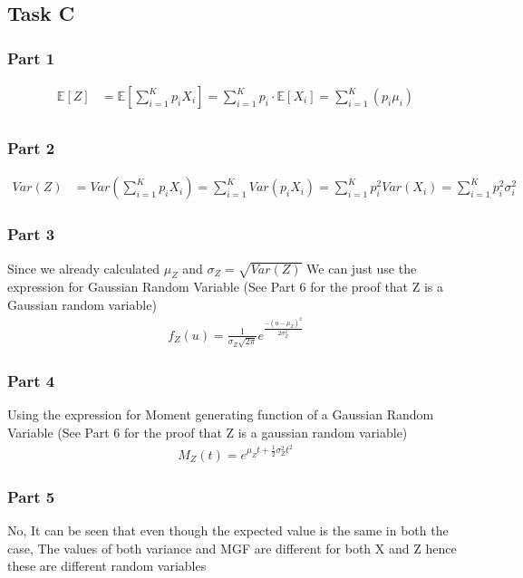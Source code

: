 \subsection{Task C}
\subsubsection{Part 1}
    \begin{align*}
        \mathbb{E}[Z]&=\mathbb{E}\left[ \sum_{i=1}^K p_iX_i\right]=\sum_{i=1}^K p_i \cdot \mathbb{E}\left[ X_i\right]=\sum_{i=1}^{K} \left(p_i\mu_i\right)\\
    \end{align*}

\subsubsection{Part 2}
    \begin{align*}
        Var(Z)&=Var\left(\sum_{i=1}^K p_iX_i\right)=\sum_{i=1}^K Var\left(p_iX_i\right)=\sum_{i=1}^K p_i^2Var\left(X_i\right)=\sum_{i=1}^K p_i^2\sigma_i^2
    \end{align*}
\subsubsection{Part 3}
    Since we already calculated $\mu_Z$ and $\sigma_Z = \sqrt{Var(Z)}$ We can just use the expression for Gaussian Random Variable (See Part 6 for the proof that Z is a Gaussian random variable)
    \begin{align*}
        f_Z(u)=\frac{1}{\sigma_Z\sqrt{2\pi}}e^{\frac{-\left(u-\mu_Z\right)^2}{2\sigma_Z^2}}
    \end{align*}
\subsubsection{Part 4}
    Using the expression for Moment generating function of a Gaussian Random Variable (See Part 6 for the proof that Z is a gaussian random variable)
    \begin{align*}
        M_Z(t) = e^{\mu_Z t +\frac{1}{2}\sigma_Z^2t^2}
    \end{align*}
\subsubsection{Part 5}
    No, It can be seen that even though the expected value is the same in both the case, The values of both variance and MGF are different for both X and Z hence these are different random variables
